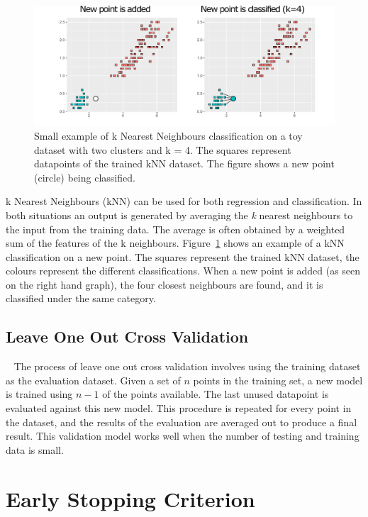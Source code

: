 \begin{figure}[t]
    \centering
    \includegraphics[width=1\textwidth]{background/graphics/knn1.pdf}
    \caption{Small example of k Nearest Neighbours classification on a toy dataset with two clusters and k = 4. The squares represent datapoints of the trained kNN dataset. The figure shows a new point (circle) being classified.}
    \label{fig:knn}
\end{figure}
k Nearest Neighbours (kNN) can be used for both regression and classification.
In both situations an output is generated by averaging the \textit{k} nearest neighbours to the input from the training data.
The average is often obtained by a weighted sum of the features of the k neighbours.
Figure~\ref{fig:knn} shows an example of a kNN classification on a new point.
The squares represent the trained kNN dataset, the colours represent the different classifications.
When a new point is added (as seen on the right hand graph), the four closest neighbours are found, and it is classified under the same category.

\subsection{Leave One Out Cross Validation}~\label{sec:valid}
The process of leave one out cross validation involves using the training dataset as the evaluation dataset.
Given a set of $n$ points in the training set, a new model is trained using $n-1$ of the points available.
The last unused datapoint is evaluated against this new model.
This procedure is repeated for every point in the dataset, and the results of the evaluation are averaged out to produce a final result.
This validation model works well when the number of testing and training data is small.

\section{Early Stopping Criterion}~\label{sec:esc}

